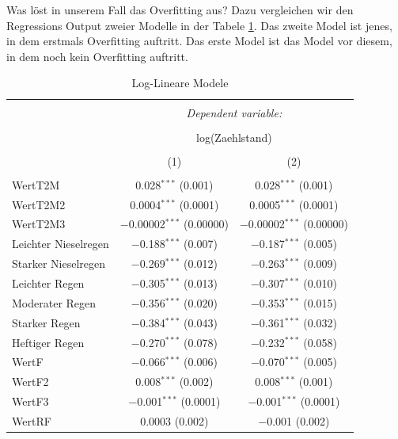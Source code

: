 \documentclass[a4paper,12pt]{thesis}
\begin{document}
Was löst in unserem Fall das Overfitting aus? Dazu vergleichen wir den Regressions Output zweier Modelle in der Tabele \ref{ZweiModelle}. Das zweite Model ist jenes, in dem erstmals Overfitting auftritt. Das erste Model ist das Model vor diesem, in dem noch kein Overfitting auftritt.


	\begin{longtable}{@{\extracolsep{-5pt}}lcc} 
		\caption{Log-Lineare Modele} 
		\label{ZweiModelle}
	\small 
		\\[-1.8ex]\hline 
		\hline \\[-1.8ex] 
		& \multicolumn{2}{c}{\textit{Dependent variable:}} \\ 
		\cline{2-3} 
		\\[-1.8ex] & \multicolumn{2}{c}{log(Zaehlstand)} \\ 
		\\[-1.8ex] & (1) & (2)\\ 
		\hline \\[-1.8ex] 
		WertT2M & 0.028$^{***}$ (0.001) & 0.028$^{***}$ (0.001) \\ 
		WertT2M2 & 0.0004$^{***}$ (0.0001) & 0.0005$^{***}$ (0.0001) \\ 
		WertT2M3 & $-$0.00002$^{***}$ (0.00000) & $-$0.00002$^{***}$ (0.00000) \\ 
		Leichter Nieselregen & $-$0.188$^{***}$ (0.007) & $-$0.187$^{***}$ (0.005) \\ 
		Starker Nieselregen & $-$0.269$^{***}$ (0.012) & $-$0.263$^{***}$ (0.009) \\ 
		Leichter Regen & $-$0.305$^{***}$ (0.013) & $-$0.307$^{***}$ (0.010) \\ 
		Moderater Regen & $-$0.356$^{***}$ (0.020) & $-$0.353$^{***}$ (0.015) \\ 
		Starker Regen & $-$0.384$^{***}$ (0.043) & $-$0.361$^{***}$ (0.032) \\ 
		Heftiger Regen & $-$0.270$^{***}$ (0.078) & $-$0.232$^{***}$ (0.058) \\ 
		WertF & $-$0.066$^{***}$ (0.006) & $-$0.070$^{***}$ (0.005) \\ 
		WertF2 & 0.008$^{***}$ (0.002) & 0.008$^{***}$ (0.001) \\ 
		WertF3 & $-$0.001$^{***}$ (0.0001) & $-$0.001$^{***}$ (0.0001) \\ 
		WertRF & 0.0003 (0.002) & $-$0.001 (0.002) \\ 

\end{longtable}
\end{document}
